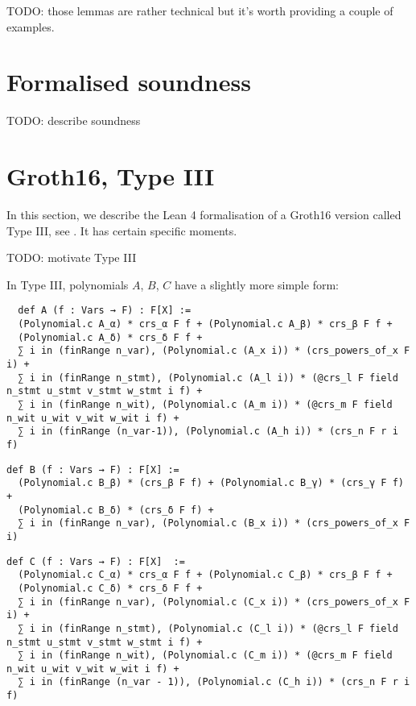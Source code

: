 \documentclass{article}
\theoremstyle{definition}
\theoremstyle{remark}
\begin{document}
TODO: those lemmas are rather technical but it's worth providing a couple of examples.

\section{Formalised soundness}

TODO: describe soundness

\section{Groth16, Type III}

In this section, we describe the Lean 4 formalisation of a Groth16 version called Type III, see \cite{baghery2021another}. It has certain specific moments.

TODO: motivate Type III

In Type III, polynomials $A$, $B$, $C$ have a slightly more simple form:
\begin{lstlisting}
  def A (f : Vars → F) : F[X] :=
  (Polynomial.c A_α) * crs_α F f + (Polynomial.c A_β) * crs_β F f +
  (Polynomial.c A_δ) * crs_δ F f +
  ∑ i in (finRange n_var), (Polynomial.c (A_x i)) * (crs_powers_of_x F i) +
  ∑ i in (finRange n_stmt), (Polynomial.c (A_l i)) * (@crs_l F field n_stmt u_stmt v_stmt w_stmt i f) +
  ∑ i in (finRange n_wit), (Polynomial.c (A_m i)) * (@crs_m F field n_wit u_wit v_wit w_wit i f) +
  ∑ i in (finRange (n_var-1)), (Polynomial.c (A_h i)) * (crs_n F r i f)
\end{lstlisting}

\begin{lstlisting}
def B (f : Vars → F) : F[X] :=
  (Polynomial.c B_β) * (crs_β F f) + (Polynomial.c B_γ) * (crs_γ F f) +
  (Polynomial.c B_δ) * (crs_δ F f) +
  ∑ i in (finRange n_var), (Polynomial.c (B_x i)) * (crs_powers_of_x F i)
\end{lstlisting}

\begin{lstlisting}
def C (f : Vars → F) : F[X]  :=
  (Polynomial.c C_α) * crs_α F f + (Polynomial.c C_β) * crs_β F f +
  (Polynomial.c C_δ) * crs_δ F f +
  ∑ i in (finRange n_var), (Polynomial.c (C_x i)) * (crs_powers_of_x F i) +
  ∑ i in (finRange n_stmt), (Polynomial.c (C_l i)) * (@crs_l F field n_stmt u_stmt v_stmt w_stmt i f) +
  ∑ i in (finRange n_wit), (Polynomial.c (C_m i)) * (@crs_m F field n_wit u_wit v_wit w_wit i f) +
  ∑ i in (finRange (n_var - 1)), (Polynomial.c (C_h i)) * (crs_n F r i f)
\end{lstlisting}



\end{document}
